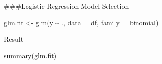 \documentclass[
]{article}
\newenvironment{Shaded}{\begin{snugshade}}{\end{snugshade}}
\newcommand{\AttributeTok}[1]{\textcolor[rgb]{0.77,0.63,0.00}{#1}}
\newcommand{\FunctionTok}[1]{\textcolor[rgb]{0.00,0.00,0.00}{#1}}
\newcommand{\NormalTok}[1]{#1}
\newcommand{\OtherTok}[1]{\textcolor[rgb]{0.56,0.35,0.01}{#1}}
\newcommand{\SpecialCharTok}[1]{\textcolor[rgb]{0.00,0.00,0.00}{#1}}
\begin{document}
\#\#\#Logistic Regression Model Selection

\begin{Shaded}
\begin{Highlighting}[]
\NormalTok{glm.fit }\OtherTok{\textless{}{-}} \FunctionTok{glm}\NormalTok{(y }\SpecialCharTok{\textasciitilde{}}\NormalTok{ ., }\AttributeTok{data =}\NormalTok{ df, }\AttributeTok{family =}\NormalTok{ binomial)}
\end{Highlighting}
\end{Shaded}

Result

\begin{Shaded}
\begin{Highlighting}[]
\FunctionTok{summary}\NormalTok{(glm.fit)}
\end{Highlighting}
\end{Shaded}
\end{document}
